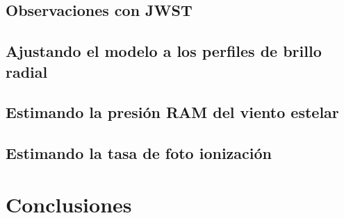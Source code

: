 \documentclass{book}
\begin{document}
\section{Observaciones con JWST}

\section{Ajustando el modelo a los perfiles de brillo radial}

\section{Estimando la presión RAM del viento estelar}

\section{Estimando la tasa de foto ionización}

\chapter{Conclusiones}
\end{document}
